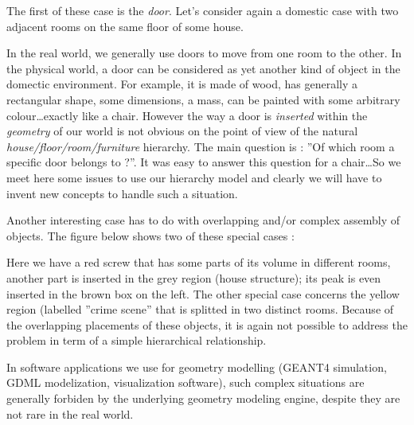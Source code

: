 \pn The first of these case is the \emph{door}. Let's consider again a
domestic case with two adjacent rooms on the same floor of some house.

\begin{center}
  \scalebox{1.0}{}
\end{center}


\pn In the real world, we generally use doors to move from one room to
the other.  In the  physical world,  a door can  be considered  as yet
another kind of  object in the domectic environment.   For example, it
is made of wood, has generally a rectangular shape, some dimensions, a
mass, can  be painted with  some arbitrary colour\dots exactly  like a
chair.  However   the  way  a   door  is  \emph{inserted}   within  the
\emph{geometry} of  our world is not  obvious on the point  of view of
the  natural  \emph{house/floor/room/furniture}  hierarchy.  The  main
question is : ''Of which room  a specific door belongs to ?''.  It was
easy to  answer this question  for a chair\dots  So we meet  here some
issues to use  our hierarchy model and clearly we  will have to invent
new concepts to handle such a situation.

\pn Another interesting case has to do with overlapping and/or complex
assembly of objects. The figure below shows two of these special cases
:
\begin{center}
  \scalebox{1.0}{}
\end{center}

\pn Here  we have a  red screw  that has some  parts of its  volume in
different rooms,  another part is  inserted in the grey  region (house
structure);  its  peak  is even  inserted  in  the  brown box  on  the
left.  The other  special case  concerns the  yellow  region (labelled
''crime scene'' that  is splitted in two distinct  rooms. Because of
the overlapping placements of these  objects, it is again not possible
to address the problem in term of a simple hierarchical relationship.

\pn  In software applications  we use  for geometry  modelling (GEANT4
simulation, GDML  modelization, visualization software),  such complex
situations are generally forbiden  by the underlying geometry modeling
engine, despite they are not rare in the real world.

